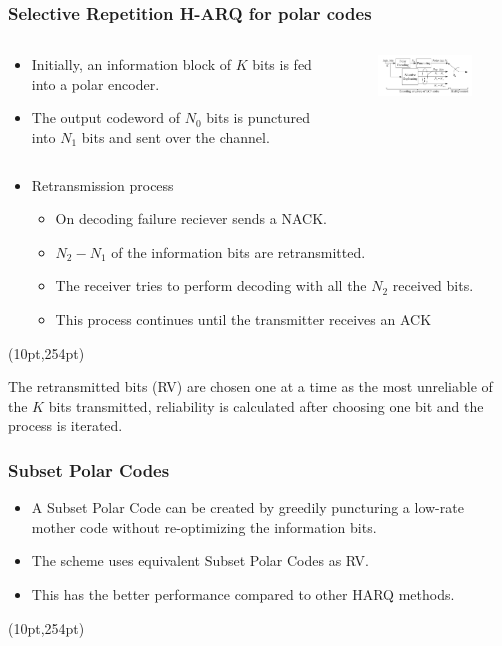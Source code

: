 \documentclass[xcolor=dvipsnames]{beamer}
\newcommand\hyperback[1]{%
  \begin{textblock*}{\paperwidth}(10pt,254pt)
    \raggedright #1\hspace{.5em}
  \end{textblock*}}
\begin{document}
\begin{frame}[label = selrep]
\frametitle{Selective Repetition H-ARQ for polar codes}
\begin{columns}
\begin{column}{0.4\textwidth}
\begin{itemize}
\item Initially, an information block of $K$ bits is fed into a polar encoder.
\item The output codeword of $N_0$ bits is punctured into $N_1$
bits and sent over the channel.
\end{itemize}
\end{column}
\begin{column}{0.5\textwidth}
\begin{figure}
\includegraphics[width=6cm]{./selrepharq.png}
\end{figure}
\end{column}
\end{columns}
\begin{itemize}
\item {Retransmission process}
\begin{itemize}
\item On decoding failure reciever sends a NACK.
\item $N_2-N_1$ of the information bits are retransmitted. 
\item The receiver tries to perform decoding with all the $N_2$ received
bits.
\item This process continues until the transmitter
receives an ACK 
\end{itemize}
\end{itemize}
\hyperback{\hyperlink{HARQ}{}}

\tiny The retransmitted bits (RV) are chosen one at a time as the most unreliable of the $K$ bits transmitted, reliability is calculated after choosing one bit and the process is iterated.
\end{frame}
\begin{frame}[label = subpol]
\frametitle{Subset Polar Codes}
\begin{itemize}
\item A Subset Polar Code can be created by greedily puncturing a low-rate mother code without re-optimizing the information bits.
\item The scheme uses equivalent Subset Polar Codes as RV.
\item This has the better performance compared to other HARQ methods.
\end{itemize}
\hyperback{\hyperlink{HARQ}{}}
\end{frame}
\end{document}

